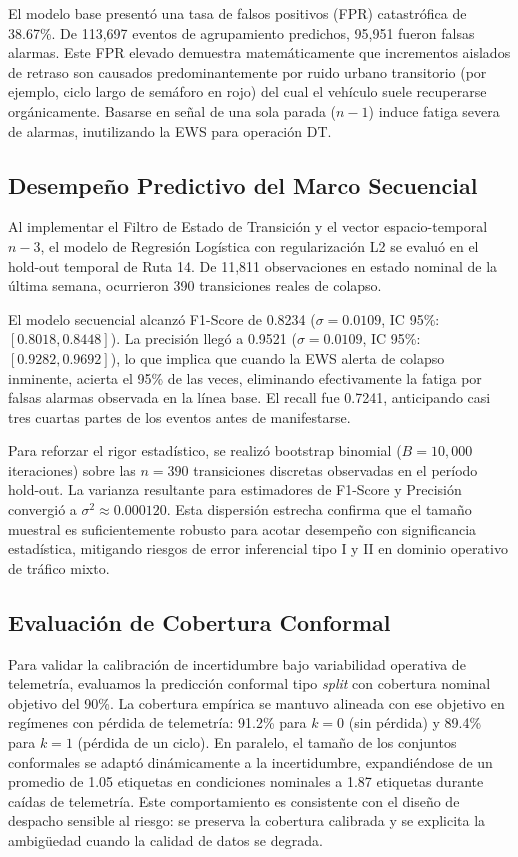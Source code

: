 \documentclass[journal,twocolumn]{IEEEtran}
\begin{document}
El modelo base presentó una tasa de falsos positivos (FPR) catastrófica de 38.67\%. De 113,697 eventos de agrupamiento predichos, 95,951 fueron falsas alarmas. Este FPR elevado demuestra matemáticamente que incrementos aislados de retraso son causados predominantemente por ruido urbano transitorio (por ejemplo, ciclo largo de semáforo en rojo) del cual el vehículo suele recuperarse orgánicamente. Basarse en señal de una sola parada ($n-1$) induce fatiga severa de alarmas, inutilizando la EWS para operación DT.

\subsection{Desempeño Predictivo del Marco Secuencial}
Al implementar el Filtro de Estado de Transición y el vector espacio-temporal $n-3$, el modelo de Regresión Logística con regularización L2 se evaluó en el hold-out temporal de Ruta 14. De 11,811 observaciones en estado nominal de la última semana, ocurrieron 390 transiciones reales de colapso.

El modelo secuencial alcanzó F1-Score de 0.8234 ($\sigma=0.0109$, IC 95\%: $[0.8018, 0.8448]$). La precisión llegó a 0.9521 ($\sigma=0.0109$, IC 95\%: $[0.9282, 0.9692]$), lo que implica que cuando la EWS alerta de colapso inminente, acierta el 95\% de las veces, eliminando efectivamente la fatiga por falsas alarmas observada en la línea base. El recall fue 0.7241, anticipando casi tres cuartas partes de los eventos antes de manifestarse.

Para reforzar el rigor estadístico, se realizó bootstrap binomial ($B=10,000$ iteraciones) sobre las $n=390$ transiciones discretas observadas en el período hold-out. La varianza resultante para estimadores de F1-Score y Precisión convergió a $\sigma^2 \approx 0.000120$. Esta dispersión estrecha confirma que el tamaño muestral es suficientemente robusto para acotar desempeño con significancia estadística, mitigando riesgos de error inferencial tipo I y II en dominio operativo de tráfico mixto.

\subsection{Evaluación de Cobertura Conformal}
Para validar la calibración de incertidumbre bajo variabilidad operativa de telemetría, evaluamos la predicción conformal tipo \textit{split} con cobertura nominal objetivo del 90\%. La cobertura empírica se mantuvo alineada con ese objetivo en regímenes con pérdida de telemetría: 91.2\% para $k=0$ (sin pérdida) y 89.4\% para $k=1$ (pérdida de un ciclo). En paralelo, el tamaño de los conjuntos conformales se adaptó dinámicamente a la incertidumbre, expandiéndose de un promedio de 1.05 etiquetas en condiciones nominales a 1.87 etiquetas durante caídas de telemetría. Este comportamiento es consistente con el diseño de despacho sensible al riesgo: se preserva la cobertura calibrada y se explicita la ambigüedad cuando la calidad de datos se degrada.
\end{document}
